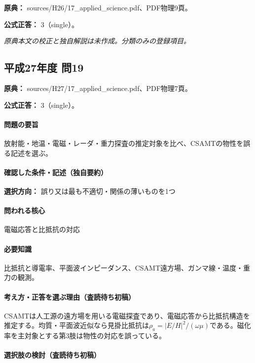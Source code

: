 \noindent\textbf{原典：} sources/H26/17\_applied\_science.pdf、PDF物理9頁。

\textbf{公式正答：} 3（single）。

\par\textit{原典本文の校正と独自解説は未作成。分類のみの登録項目。}

\subsection{平成27年度 問19}
\label{q:h27-reg-applied-19}

\noindent\textbf{原典：} sources/H27/17\_applied\_science.pdf、PDF物理7頁。

\textbf{公式正答：} 3（single）。

\paragraph{問題の要旨} 放射能・地温・電磁・レーダ・重力探査の推定対象を比べ、CSAMTの物性を誤る記述を選ぶ。

\paragraph{確認した条件・記述（独自要約）}\mbox{}\par

\noindent\textbf{選択方向：} 誤り又は最も不適切・関係の薄いものを1つ\par

\paragraph{問われる核心} 電磁応答と比抵抗の対応

\paragraph{必要知識} 比抵抗と導電率、平面波インピーダンス、CSAMT遠方場、ガンマ線・温度・重力の観測。

\paragraph{考え方・正答を選ぶ理由（査読待ち初稿）} CSAMTは人工源の遠方場を用いる電磁探査であり、電磁応答から比抵抗構造を推定する。均質・平面波近似なら見掛比抵抗は\(\rho_a=|E/H|^2/(\omega\mu)\)である。磁化率を主対象とする第3肢は物性の対応を誤っている。

\paragraph{選択肢の検討（査読待ち初稿）}\mbox{}\par

